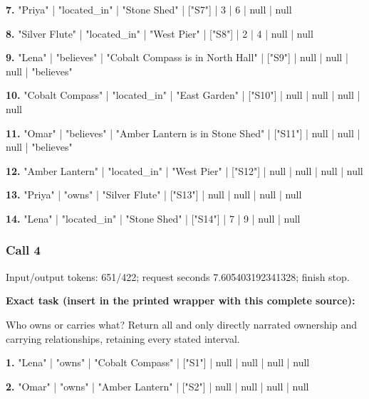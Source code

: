 \noindent\textbf{7.} "Priya" | "located\_in" | "Stone Shed" | ["S7"] | 3 | 6 | null | null\par\smallskip

\noindent\textbf{8.} "Silver Flute" | "located\_in" | "West Pier" | ["S8"] | 2 | 4 | null | null\par\smallskip

\noindent\textbf{9.} "Lena" | "believes" | "Cobalt Compass is in North Hall" | ["S9"] | null | null | null | "believes"\par\smallskip

\noindent\textbf{10.} "Cobalt Compass" | "located\_in" | "East Garden" | ["S10"] | null | null | null | null\par\smallskip

\noindent\textbf{11.} "Omar" | "believes" | "Amber Lantern is in Stone Shed" | ["S11"] | null | null | null | "believes"\par\smallskip

\noindent\textbf{12.} "Amber Lantern" | "located\_in" | "West Pier" | ["S12"] | null | null | null | null\par\smallskip

\noindent\textbf{13.} "Priya" | "owns" | "Silver Flute" | ["S13"] | null | null | null | null\par\smallskip

\noindent\textbf{14.} "Lena" | "located\_in" | "Stone Shed" | ["S14"] | 7 | 9 | null | null\par\smallskip

\subsubsection*{Call 4}

Input/output tokens: 651/422; request seconds 7.605403192341328; finish stop.

\noindent\textbf{Exact task (insert in the printed wrapper with this complete source):}\par Who owns or carries what? Return all and only directly narrated ownership and carrying relationships, retaining every stated interval.

\noindent\textbf{1.} "Lena" | "owns" | "Cobalt Compass" | ["S1"] | null | null | null | null\par\smallskip

\noindent\textbf{2.} "Omar" | "owns" | "Amber Lantern" | ["S2"] | null | null | null | null\par\smallskip

